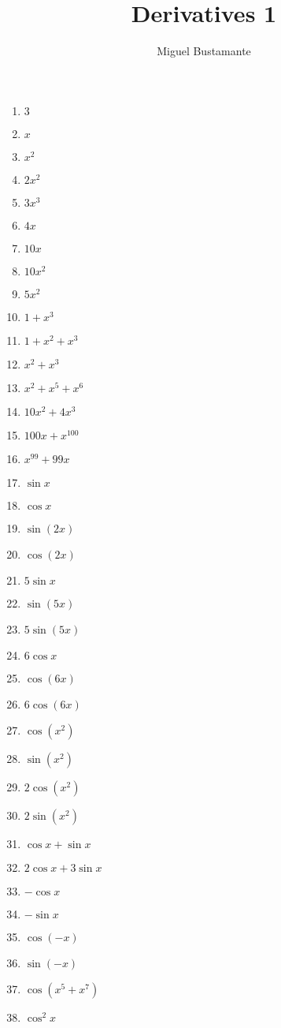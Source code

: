 \documentclass{article}
\title{Derivatives 1}
\author{Miguel Bustamante}
\begin{document}
\maketitle
\begin{multicols}{3} %
\begin{enumerate}
    \item $3$
    \item $x$
    \item $x^2$
    \item $2x^2$
    \item $3x^3$
    \item $4x$
    \item $10x$
    \item $10x^2$
    \item $5x^2$
    \item $1+x^3$
    \item $1+x^2+x^3$
    \item $x^2+x^3$
    \item $x^2+x^5+x^6$
    \item $10x^2+4x^3$
    \item $100x+x^{100}$
    \item $x^{99}+99x$
    \item $\sin x$
    \item $\cos x$
    \item $\sin(2x)$
    \item $\cos(2x)$
    \item $5\sin x$
    \item $\sin(5x)$
    \item $5\sin(5x)$
    \item $6\cos x$
    \item $\cos(6x)$
    \item $6\cos(6x)$
    \item $\cos(x^2)$
    \item $\sin(x^2)$
    \item $2\cos(x^2)$
    \item $2\sin(x^2)$
    \item $\cos x+\sin x$
    \item $2\cos x+3\sin x$
    \item $-\cos x$
    \item $-\sin x$
    \item $\cos(-x)$
    \item $\sin(-x)$
    \item $\cos(x^5+x^7)$
    \item $\cos^2 x$

\end{enumerate}
\end{multicols}
\end{document}
